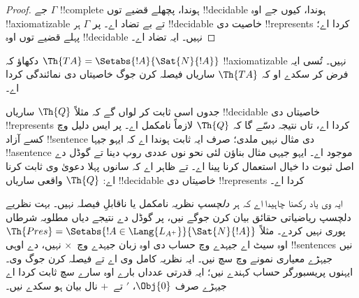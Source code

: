 \documentclass[../../../include/open-logic-section]{subfiles}
\begin{document}
\begin{proof}
جے $\Gamma$
!!{complete} ہوندا،
پچھلے قضیے توں
!!{decidable} ہوندا،
کیوں جے اوہ
!!{axiomatizable}
تے بے تضاد اے۔
پر $\Gamma$
ہر !!{decidable}
خاصیت دی
!!{represents}
کردا اے؛ پہلے
قضیے توں اوہ
!!{decidable}
نہیں۔ ایہ تضاد اے۔
\end{proof}

\begin{prob}
دکھاؤ کہ
$\Th{TA} = \Setabs{!A}{\Sat{N}{!A}}$
!!{axiomatizable}
نہیں۔ تُسی
ایہ فرض کر
سکدے او کہ
$\Th{TA}$
ساریاں فیصلہ
کرن جوگ
خاصیتاں دی
نمائندگی کردا اے۔
\end{prob}

جدوں اسی ثابت
کر لواں گے
کہ مثلاً
$\Th{Q}$
ساریاں
!!{decidable}
خاصیتاں دی
!!{represents}
کردا اے،
تاں نتیجہ
دسّے گا کہ
$\Th{Q}$
لازماً نامکمل
اے۔ پر ایس
دلیل وچ کسے
آزاد !!{sentence}
دی مثال نہیں
ملدی؛ صرف
ایہ ثابت
ہوندا اے کہ
ایہو جیہا !!a{sentence}
موجود اے۔
ایہو جیہی مثال
بناؤن لئی
نحو نوں عددی
روپ دینا تے
گوڈل دے
اصل ثبوت
دا خیال
استعمال کرنا
پینا اے۔
تے ظاہر اے
کہ سانوں
پہلا دعویٰ وی
ثابت کرنا
اے: $\Th{Q}$
واقعی ساریاں
!!{decidable}
خاصیتاں دی
!!{represents}
کردا اے۔

ایہ وی یاد
رکھنا چاہیدا
اے کہ ہر
\emph{دلچسپ}
نظریہ نامکمل
یا ناقابلِ
فیصلہ نہیں۔
بہت نظریے
دلچسپ ریاضیاتی
حقائق بیان
کرن جوگے
نیں، پر گوڈل
دے نتیجے
دیاں مطلوبہ
شرطاں پوری
نہیں کردے۔
مثلاً
$\Th{Pres} = \Setabs{!A \in \Lang{L_{A^+}}}{\Sat{N}{!A}}$
اوہ سیٹ اے جیہدے وچ حساب دی
اوہ زبان جیہدے وچ~$\times$ نہیں،
دے اوہی !!{sentence}s نیں
جیہڑے معیاری نمونے وچ سچ نیں۔
ایہ نظریہ
کامل وی اے
تے فیصلہ کرن
جوگ وی۔
ایہنوں
پریسبورگر
حساب کہندے
نیں؛ ایہ
قدرتی عدداں
بارے اوہ
سارے سچ
ثابت کردا اے
جیہڑے صرف
$\Obj{0}$،
$\prime$ تے~$+$
نال بیان
ہو سکدے نیں۔
\end{document}
